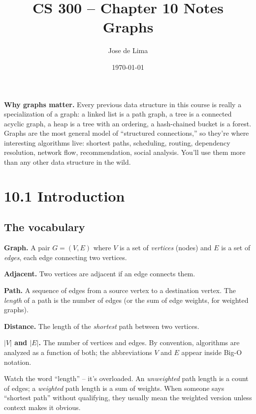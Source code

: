 \documentclass[11pt]{article}
\title{CS 300 -- Chapter 10 Notes\\\large Graphs}
\author{Jose de Lima}
\date{\today}
\begin{document}
\maketitle

\begin{ideabox}
\textbf{Why graphs matter.} Every previous data structure in this course is really a specialization of a graph: a linked list is a path graph, a tree is a connected acyclic graph, a heap is a tree with an ordering, a hash-chained bucket is a forest. Graphs are the most general model of ``structured connections,'' so they're where interesting algorithms live: shortest paths, scheduling, routing, dependency resolution, network flow, recommendation, social analysis. You'll use them more than any other data structure in the wild.
\end{ideabox}

\section{10.1 Introduction}

\subsection*{The vocabulary}

\begin{defnbox}
\textbf{Graph.} A pair $G = (V, E)$ where $V$ is a set of \emph{vertices} (nodes) and $E$ is a set of \emph{edges}, each edge connecting two vertices.

\textbf{Adjacent.} Two vertices are adjacent if an edge connects them.

\textbf{Path.} A sequence of edges from a source vertex to a destination vertex. The \emph{length} of a path is the number of edges (or the sum of edge weights, for weighted graphs).

\textbf{Distance.} The length of the \emph{shortest} path between two vertices.

\textbf{$|V|$ and $|E|$.} The number of vertices and edges. By convention, algorithms are analyzed as a function of both; the abbreviations $V$ and $E$ appear inside Big-O notation.
\end{defnbox}

\begin{notebox}
Watch the word ``length'' -- it's overloaded. An \emph{unweighted} path length is a count of edges; a \emph{weighted} path length is a sum of weights. When someone says ``shortest path'' without qualifying, they usually mean the weighted version unless context makes it obvious.
\end{notebox}
\end{document}
